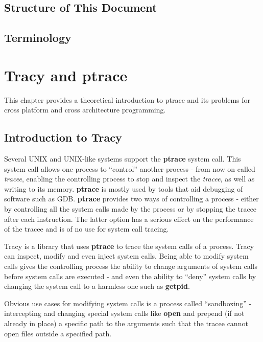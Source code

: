 \documentclass[a4paper, 10pt]{report}
\begin{document}
\section{Structure of This Document}



\section{Terminology}


\chapter{Tracy and ptrace}

This chapter provides a theoretical introduction to ptrace and its problems for
cross platform and cross architecture programming.

\section{Introduction to Tracy}
Several UNIX and UNIX-like systems support the \textbf{ptrace} system call.
This system call allows one process to ``control'' another process - from now on
called \textit{tracee}, enabling the controlling process to stop and inspect
the \textit{tracee}, as well as writing to its memory. \textbf{ptrace} is
mostly used by tools that aid debugging of software such as GDB\cite{gdb}.
\textbf{ptrace} provides two ways of controlling a process
- either by controlling all the system calls made by the process or by stopping
the tracee after each instruction. The latter option has a serious effect on the
performance of the tracee and is of no use for system call tracing.

Tracy is a library that uses \textbf{ptrace} to trace the system calls of
a process. Tracy can inspect, modify and even inject system calls. Being able to
modify system calls gives the controlling process the ability to change
arguments of system calls before system calls are executed - and even the
ability to ``deny'' system calls by changing the system call to a harmless
one such as \textbf{getpid}.

Obvious use cases for modifying system calls is a process
called ``sandboxing'' - intercepting and changing special system calls like
\textbf{open} and prepend (if not already in place) a specific path to the
arguments such that the tracee cannot open files outside a specified path.
\end{document}
